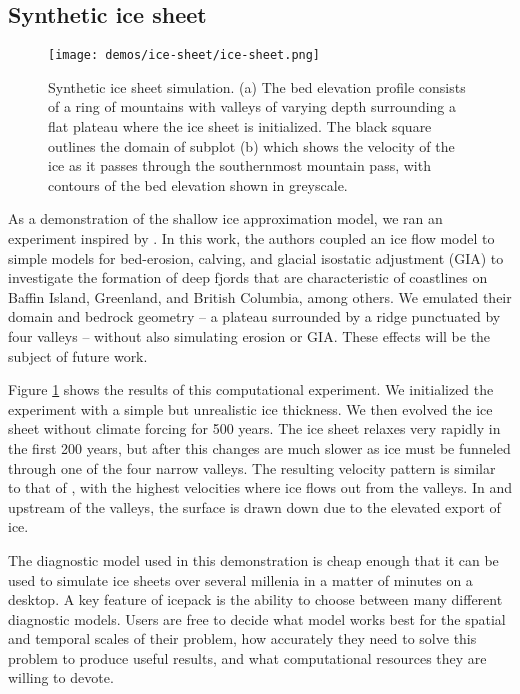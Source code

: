 \documentclass{article}
\theoremstyle{definition}
\theoremstyle{plain}
\begin{document}
\subsection{Synthetic ice sheet}

\begin{figure}[h]
    \texttt{[image: demos/ice-sheet/ice-sheet.png]}
    \caption{Synthetic ice sheet simulation. (a) The bed elevation profile consists of a ring of mountains with valleys of varying depth surrounding a flat plateau where the ice sheet is initialized.
    The black square outlines the domain of subplot (b) which shows the velocity of the ice as it passes through the southernmost mountain pass, with contours of the bed elevation shown in greyscale.}
    \label{fig:ice-sheet}
\end{figure}

As a demonstration of the shallow ice approximation model, we ran an experiment inspired by \cite{kessler2008fjord}.
In this work, the authors coupled an ice flow model to simple models for bed-erosion, calving, and glacial isostatic adjustment (GIA) to investigate the formation of deep fjords that are characteristic of coastlines on Baffin Island, Greenland, and British Columbia, among others.
We emulated their domain and bedrock geometry -- a plateau surrounded by a ridge punctuated by four valleys -- without also simulating erosion or GIA.
These effects will be the subject of future work.

Figure \ref{fig:ice-sheet} shows the results of this computational experiment.
We initialized the experiment with a simple but unrealistic ice thickness.
We then evolved the ice sheet without climate forcing for 500 years.
The ice sheet relaxes very rapidly in the first 200 years, but after this changes are much slower as ice must be funneled through one of the four narrow valleys.
The resulting velocity pattern is similar to that of \citet{kessler2008fjord}, with the highest velocities where ice flows out from the valleys.
In and upstream of the valleys, the surface is drawn down due to the elevated export of ice.

The diagnostic model used in this demonstration is cheap enough that it can be used to simulate ice sheets over several millenia in a matter of minutes on a desktop.
A key feature of icepack is the ability to choose between many different diagnostic models.
Users are free to decide what model works best for the spatial and temporal scales of their problem, how accurately they need to solve this problem to produce useful results, and what computational resources they are willing to devote.
\end{document}
